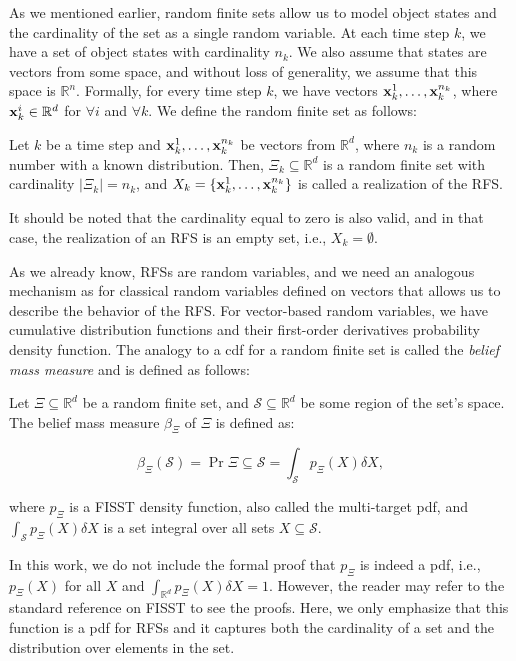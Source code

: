 As we mentioned earlier, random finite sets allow us to model object states and the cardinality of the set as a single random variable. At each time step $k$, we have a set of object states with cardinality $n_k$. We also assume that states are vectors from some space, and without loss of generality, we assume that this space is $\mathbb{R}^n$. Formally, for every time step $k$, we have vectors ${\vecat{x}{k}^{1}, \ldots, \vecat{x}{k}^{n_k}}$, where $\vecat{x}{k}^{i} \in \mathbb{R}^d$ for $\forall i$ and $\forall k$. We define the random finite set as follows:

\begin{definition}
    Let $k$ be a time step and ${\vecat{x}{k}^{1}, \ldots, \vecat{x}{k}^{n_k}}$ be vectors from $\mathbb{R}^d$, where $n_k$ is a random number with a known distribution. Then, $\Xi_k \subseteq \mathbb{R}^d$ is a random finite set with cardinality $|\Xi_k| = n_k$, and $X_k = \{\vecat{x}{k}^{1}, \ldots, \vecat{x}{k}^{n_k}\}$ is called a realization of the RFS.
\end{definition}


It should be noted that the cardinality equal to zero is also valid, and in that case, the realization of an RFS is an empty set, i.e., $X_k = \emptyset$.

As we already know, RFSs are random variables, and we need an analogous mechanism as for classical random variables defined on vectors that allows us to describe the behavior of the RFS. For vector-based random variables, we have cumulative distribution functions and their first-order derivatives probability density function. The analogy to a cdf for a random finite set is called the \textit{belief mass measure} and is defined as follows:

\begin{definition}
    Let $\Xi \subseteq \mathbb{R}^d$ be a random finite set, and $\mathcal{S} \subseteq \mathbb{R}^d$ be some region of the set's space. The belief mass measure $\beta_\Xi$ of $\Xi$ is defined as:

    \begin{equation}
        \beta_\Xi(\mathcal{S})
        = \Pr{\Xi \subseteq \mathcal{S}}
        = \int_\mathcal{S} p_\Xi(X)\delta X,
    \end{equation}

    where $p_\Xi$ is a FISST density function, also called the multi-target pdf, and $\int_\mathcal{S} p_\Xi(X)\delta X$ is a set integral over all sets $X \subseteq \mathcal{S}$.
\end{definition}

In this work, we do not include the formal proof that $p_\Xi$ is indeed a pdf, i.e., $p_\Xi(X)$ for all $X$ and $\int_{\mathbb{R}^d} p_\Xi(X)\delta X = 1$. However, the reader may refer to the standard reference on FISST \cite{mahlerStatisticalMultisourcemultitargetInformation2007} to see the proofs. Here, we only emphasize that this function is a pdf for RFSs and it captures both the cardinality of a set and the distribution over elements in the set.
